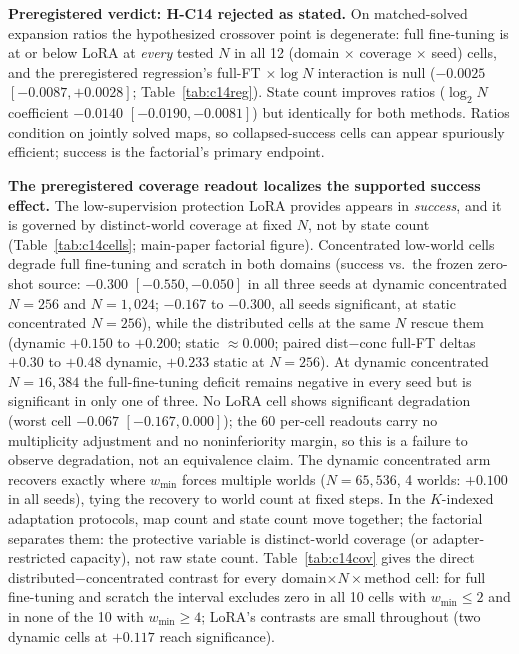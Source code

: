 \documentclass[letterpaper]{article} %
\begin{document}
\textbf{Preregistered verdict: H-C14 rejected as stated.} On matched-solved expansion ratios the hypothesized crossover point is degenerate: full fine-tuning is at or below LoRA at \emph{every} tested $N$ in all 12 (domain $\times$ coverage $\times$ seed) cells, and the preregistered regression's full-FT $\times \log N$ interaction is null ($-0.0025$ $[-0.0087, +0.0028]$; Table~\ref{tab:c14reg}). State count improves ratios ($\log_2 N$ coefficient $-0.0140$ $[-0.0190, -0.0081]$) but identically for both methods. Ratios condition on jointly solved maps, so collapsed-success cells can appear spuriously efficient; success is the factorial's primary endpoint.

\textbf{The preregistered coverage readout localizes the supported success effect.} The low-supervision protection LoRA provides appears in \emph{success}, and it is governed by distinct-world coverage at fixed $N$, not by state count (Table~\ref{tab:c14cells}; main-paper factorial figure). Concentrated low-world cells degrade full fine-tuning and scratch in both domains (success vs.\ the frozen zero-shot source: $-0.300$ $[-0.550,-0.050]$ in all three seeds at dynamic concentrated $N{=}256$ and $N{=}1{,}024$; $-0.167$ to $-0.300$, all seeds significant, at static concentrated $N{=}256$), while the distributed cells at the same $N$ rescue them (dynamic $+0.150$ to $+0.200$; static $\approx 0.000$; paired dist$-$conc full-FT deltas $+0.30$ to $+0.48$ dynamic, $+0.233$ static at $N{=}256$). At dynamic concentrated $N{=}16{,}384$ the full-fine-tuning deficit remains negative in every seed but is significant in only one of three. No LoRA cell shows significant degradation (worst cell $-0.067$ $[-0.167, 0.000]$); the 60 per-cell readouts carry no multiplicity adjustment and no noninferiority margin, so this is a failure to observe degradation, not an equivalence claim. The dynamic concentrated arm recovers exactly where $w_{\min}$ forces multiple worlds ($N{=}65{,}536$, 4 worlds: $+0.100$ in all seeds), tying the recovery to world count at fixed steps. In the $K$-indexed adaptation protocols, map count and state count move together; the factorial separates them: the protective variable is distinct-world coverage (or adapter-restricted capacity), not raw state count. Table~\ref{tab:c14cov} gives the direct distributed$-$concentrated contrast for every domain$\times N\times$method cell: for full fine-tuning and scratch the interval excludes zero in all 10 cells with $w_{\min} \leq 2$ and in none of the 10 with $w_{\min} \geq 4$; LoRA's contrasts are small throughout (two dynamic cells at $+0.117$ reach significance).
\end{document}
